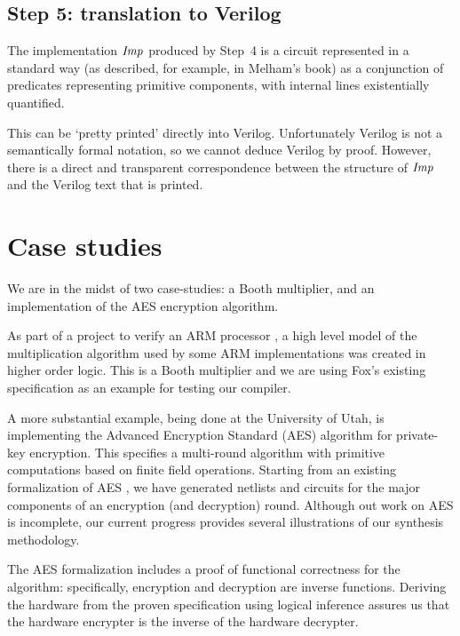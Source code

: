 \documentclass{llncs}
\begin{document}
\vspace*{-3mm}

\subsection*{Step 5: translation to Verilog}

The implementation ${\it{Imp}}$ produced by Step~4 is a circuit
represented in a standard way (as described, for example, in Melham's book)
as a conjunction of predicates representing primitive components,
with internal lines existentially quantified.

This can be `pretty printed' directly into Verilog. Unfortunately
Verilog is not a semantically formal notation, so we cannot deduce
Verilog by proof. However, there is a direct and transparent
correspondence between the structure of ${\it{Imp}}$ and the Verilog
text that is printed.

\section{Case studies}
\label{secCaseStudy}


We are in the midst of two case-studies: a Booth multiplier, and an implementation
of the AES encryption algorithm.

As part of a project to verify an ARM processor \cite{Fox02}, a high
level model of the multiplication algorithm used by some ARM
implementations was created in higher order logic. This is a Booth
multiplier and we are using Fox's existing specification as an example
for testing our compiler. 


A more substantial example, being done at the University of Utah, is
implementing the Advanced Encryption Standard (AES) \cite{AES}
algorithm for private-key encryption. This specifies a multi-round
algorithm with primitive computations based on finite field
operations.  Starting from an existing formalization of AES
\cite{slind:aes}, we have generated netlists and circuits for the major
components of an encryption (and decryption) round.  Although out work on AES
is incomplete, our current progress provides several illustrations of our
synthesis methodology.

The AES formalization includes a proof of functional correctness  for the
algorithm: specifically, encryption and decryption are inverse functions.
Deriving the hardware from the proven specification using logical inference
assures us that the hardware encrypter is the inverse of the hardware
decrypter.
\end{document}
